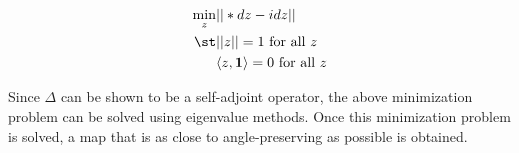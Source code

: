 \begin{align*}
    \min_z & ||*dz - idz|| \\
    \st &||z|| = 1 \text{ for all $z$} \\
    &\langle z, \mathbf{1} \rangle = 0 \text{ for all $z$}
\end{align*}

Since $\Delta$ can be shown to be a self-adjoint operator, the above minimization problem can be solved using eigenvalue methods. Once this minimization problem is solved, a map that is as close to angle-preserving as possible is obtained.


    
    
    
